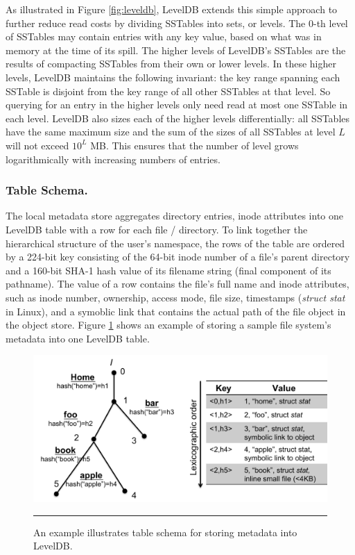As illustrated in Figure \ref{fig:leveldb}, LevelDB extends this simple approach to further reduce read costs by dividing SSTables into sets, or levels.
The 0-th level of SSTables may contain entries with any key value, based on what was in memory at the time of its spill.
The higher levels of LevelDB's SSTables are the results of compacting SSTables from their own or lower levels.
In these higher levels, LevelDB maintains the following invariant: the key range spanning each SSTable is disjoint from the key range of all other SSTables at that level.
So querying for an entry in the higher levels only need read at most one SSTable in each level.
LevelDB also sizes each of the higher levels differentially:  all SSTables have the same maximum size and the sum of the sizes of all SSTables at level $L$ will not exceed $10^L$ MB.
This ensures that the number of level grows logarithmically with increasing numbers of entries.

\subsubsection*{Table Schema. } 

The local metadata store aggregates directory entries, 
inode attributes into one LevelDB table with a row for each file / directory.
To link together the hierarchical structure of the user's namespace,
the rows of the table are ordered by a 224-bit key consisting of 
the 64-bit inode number of a file's parent directory 
and a 160-bit SHA-1 hash value of its filename string (final component of its pathname).
The value of a row contains the file's full name and inode attributes,
such as inode number, ownership, access mode, file size, timestamps (\textit{struct stat} in Linux),
and a symoblic link that contains the actual path of the file object in the object store.
Figure \ref{fig:schema} shows an example of storing a sample file system's metadata into one LevelDB table.

\begin{figure}[t]
\centering
\includegraphics[scale=0.35]{figs/schema}
\caption{An example illustrates table schema for storing metadata into LevelDB.}
\vspace{10pt}
\hrule 
\label{fig:schema}
\end{figure}

